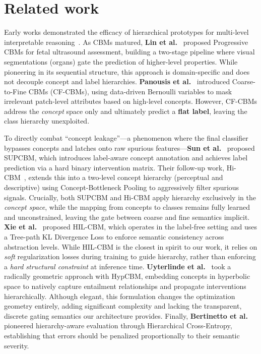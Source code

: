 \documentclass[sigconf, nonacm]{acmart}
\begin{document}
\section{Related work}
Early works demonstrated the efficacy of hierarchical prototypes for multi-level interpretable reasoning~\cite{Hase_2019}. As CBMs matured, \textbf{Lin et al.}~\cite{Lin_2025} proposed Progressive CBMs for fetal ultrasound assessment, building a two-stage pipeline where visual segmentations (organs) gate the prediction of higher-level properties. While pioneering in its sequential structure, this approach is domain-specific and does not decouple concept and label hierarchies. \textbf{Panousis et al.}~\cite{Panousis_2023} introduced Coarse-to-Fine CBMs (CF-CBMs), using data-driven Bernoulli variables to mask irrelevant patch-level attributes based on high-level concepts. However, CF-CBMs address the \textit{concept} space only and ultimately predict a \textbf{flat label}, leaving the class hierarchy unexploited.

To directly combat ``concept leakage''---a phenomenon where the final classifier bypasses concepts and latches onto raw spurious features---\textbf{Sun et al.}~\cite{Sun_2024} proposed SUPCBM, which introduces label-aware concept annotation and achieves label prediction via a hard binary intervention matrix. Their follow-up work, Hi-CBM~\cite{Sun_2026}, extends this into a two-level concept hierarchy (perceptual and descriptive) using Concept-Bottleneck Pooling to aggressively filter spurious signals. Crucially, both SUPCBM and Hi-CBM apply hierarchy exclusively in the \textit{concept space}, while the mapping from concepts to classes remains fully learned and unconstrained, leaving the gate between coarse and fine semantics implicit. \textbf{Xie et al.}~\cite{Xie_2026} proposed HIL-CBM, which operates in the label-free setting and uses a Tree-path KL Divergence Loss to enforce semantic consistency across abstraction levels. While HIL-CBM is the closest in spirit to our work, it relies on \textit{soft} regularization losses during training to guide hierarchy, rather than enforcing a \textit{hard structural constraint} at inference time. \textbf{Uyterlinde et al.}~\cite{Uyterlinde_2026} took a radically geometric approach with HypCBM, embedding concepts in hyperbolic space to natively capture entailment relationships and propagate interventions hierarchically. Although elegant, this formulation changes the optimization geometry entirely, adding significant complexity and lacking the transparent, discrete gating semantics our architecture provides. Finally, \textbf{Bertinetto et al.}~\cite{Bertinetto_2020} pioneered hierarchy-aware evaluation through Hierarchical Cross-Entropy, establishing that errors should be penalized proportionally to their semantic severity.
\end{document}
